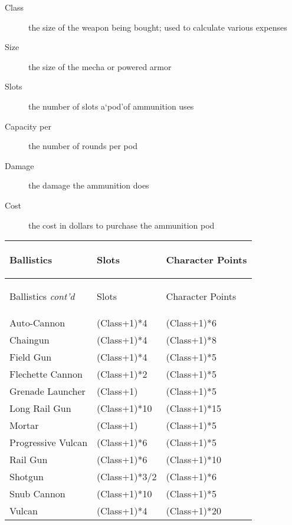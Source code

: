 \documentclass[twoside]{book}
\begin{document}
\begin{description}
    
  \item[Class] 
    {  
    the size of the weapon being bought; used to calculate various expenses
    }
  
  \item[Size] 
    {  
    the size of the mecha or powered armor
    }
  
  \item[Slots] 
    {  
    the number of slots a`pod'of ammunition uses
    }
  
  \item[Capacity per] 
    {  
    the number of rounds per pod
    }
  
  \item[Damage] 
    {  
    the damage the ammunition does
    }
  
  \item[Cost] 
    {  
    the cost in dollars to purchase the ammunition pod
    }
  
\end{description}
  
\begin{longtable}{p{1.25in}ll} 
  Ballistics& \begin{turn}{70}{Slots}\end{turn}
          & \begin{turn}{70}{Character Points}\end{turn}
          \\
  \hline
  \hline
  \endfirsthead
  Ballistics \textit{cont'd}
        & \begin{turn}{70}{Slots}\end{turn}
          & \begin{turn}{70}{Character Points}\end{turn}
           \\
  \hline
  \endhead
\raggedright Auto-Cannon&(Class+1)*4&(Class+1)*6\tabularnewline
      \raggedright Chaingun&(Class+1)*4&(Class+1)*8\tabularnewline
      \raggedright Field Gun&(Class+1)*4&(Class+1)*5\tabularnewline
      \raggedright Flechette Cannon&(Class+1)*2&(Class+1)*5\tabularnewline
      \raggedright Grenade Launcher&(Class+1)&(Class+1)*5\tabularnewline
      \raggedright Long Rail Gun&(Class+1)*10&(Class+1)*15\tabularnewline
      \raggedright Mortar&(Class+1)&(Class+1)*5\tabularnewline
      \raggedright Progressive Vulcan&(Class+1)*6&(Class+1)*5\tabularnewline
      \raggedright Rail Gun&(Class+1)*6&(Class+1)*10\tabularnewline
      \raggedright Shotgun&(Class+1)*3/2&(Class+1)*6\tabularnewline
      \raggedright Snub Cannon&(Class+1)*10&(Class+1)*5\tabularnewline
      \raggedright Vulcan&(Class+1)*4&(Class+1)*20\tabularnewline
      
\end{longtable}
    
\end{document}
